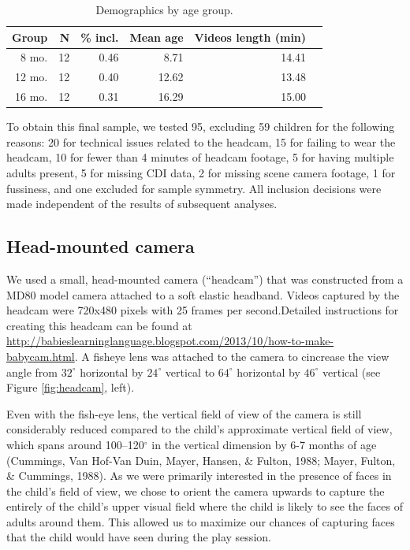 \documentclass[10pt, letterpaper]{article}
\begin{document}
\begin{table}[H]
\centering
\begin{tabular}{rrrrrr}
  \hline
 Group & N & \% incl. & Mean age & Videos length (min) \\ 
  \hline
   8 mo. &   12 & 0.46 & 8.71 & 14.41 \\ 
   12 mo. &  12 & 0.40 & 12.62 & 13.48 \\ 
   16 mo. &  12 & 0.31 & 16.29 & 15.00\\ 
   \hline
\end{tabular}
\caption{\label{tab:pop} Demographics by age group.}
\end{table}

To obtain this final sample, we tested 95, excluding 59 children for the
following reasons: 20 for technical issues related to the headcam, 15
for failing to wear the headcam, 10 for fewer than 4 minutes of headcam
footage, 5 for having multiple adults present, 5 for missing CDI data, 2
for missing scene camera footage, 1 for fussiness, and one excluded for
sample symmetry. All inclusion decisions were made independent of the
results of subsequent analyses.

\subsection{Head-mounted camera}\label{head-mounted-camera}

We used a small, head-mounted camera (``headcam'') that was constructed
from a MD80 model camera attached to a soft elastic headband. Videos
captured by the headcam were 720x480 pixels with 25 frames per
second.Detailed instructions for creating this headcam can be found at
\url{http://babieslearninglanguage.blogspot.com/2013/10/how-to-make-babycam.html}.
A fisheye lens was attached to the camera to cincrease the view angle
from \(32^{\circ}\) horizontal by \(24^{\circ}\) vertical to
\(64^{\circ}\) horizontal by \(46^{\circ}\) vertical (see Figure
\ref{fig:headcam}, left).

Even with the fish-eye lens, the vertical field of view of the camera is
still considerably reduced compared to the child's approximate vertical
field of view, which spans around 100--120\(^{\circ}\) in the vertical
dimension by 6-7 months of age (Cummings, Van Hof-Van Duin, Mayer,
Hansen, \& Fulton, 1988; Mayer, Fulton, \& Cummings, 1988). As we were
primarily interested in the presence of faces in the child's field of
view, we chose to orient the camera upwards to capture the entirely of
the child's upper visual field where the child is likely to see the
faces of adults around them. This allowed us to maximize our chances of
capturing faces that the child would have seen during the play session.
\end{document}
